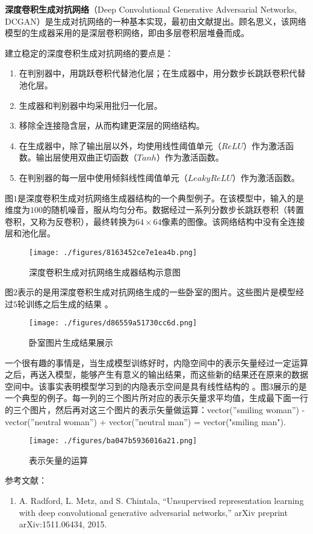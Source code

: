 
\textbf{深度卷积生成对抗网络}（Deep Convolutional Generative Adversarial Networks, DCGAN）是生成对抗网络的一种基本实现，最初由文献\cite{DCGAN}提出。顾名思义，该网络模型的生成器采用的是深层卷积网络，即由多层卷积层堆叠而成。

建立稳定的深度卷积生成对抗网络的要点是\cite{DCGAN}：
\begin{enumerate}
\item 在判别器中，用跳跃卷积代替池化层；在生成器中，用分数步长跳跃卷积代替池化层。
\item 生成器和判别器中均采用批归一化层。
\item 移除全连接隐含层，从而构建更深层的网络结构。
\item 在生成器中，除了输出层以外，均使用线性阈值单元（$ReLU$）作为激活函数。输出层使用双曲正切函数（$Tanh$）作为激活函数。
\item 在判别器的每一层中使用倾斜线性阈值单元（$Leaky ReLU$）作为激活函数。
\end{enumerate}

图$1$是深度卷积生成对抗网络生成器结构的一个典型例子。在该模型中，输入的是维度为$100$的随机噪音，服从均匀分布。数据经过一系列分数步长跳跃卷积（转置卷积，又称为反卷积），最终转换为$64 \times64$像素的图像。该网络结构中没有全连接层和池化层。
\begin{figure}[ht]
\centering
\texttt{[image: ./figures/8163452ce7e1ea4b.png]}
\caption{深度卷积生成对抗网络生成器结构示意图 \cite{DCGAN}} \label{fig_DCGAN_1}
\end{figure}

图$2$表示的是用深度卷积生成对抗网络生成的一些卧室的图片。这些图片是模型经过$5$轮训练之后生成的结果 \cite{DCGAN}。
\begin{figure}[ht]
\centering
\texttt{[image: ./figures/d86559a51730cc6d.png]}
\caption{卧室图片生成结果展示} \label{fig_DCGAN_2}
\end{figure}

一个很有趣的事情是，当生成模型训练好时，内隐空间中的表示矢量经过一定运算之后，再送入模型，能够产生有意义的输出结果，而这些新的结果还在原来的数据空间中。该事实表明模型学习到的内隐表示空间是具有线性结构的 \cite{DCGAN}。图$3$展示的是一个典型的例子。每一列的三个图片所对应的表示矢量求平均值，生成最下面一行的三个图片，然后再对这三个图片的表示矢量做运算：vector(”smiling woman”) - vector(”neutral woman”) + vector(”neutral man”) = vector("smiling man").

\begin{figure}[ht]
\centering
\texttt{[image: ./figures/ba047b5936016a21.png]}
\caption{表示矢量的运算} \label{fig_DCGAN_3}
\end{figure}




参考文献：
\begin{enumerate}
\item A. Radford, L. Metz, and S. Chintala, “Unsupervised representation learning with deep convolutional generative adversarial networks,” arXiv preprint arXiv:1511.06434, 2015.
\end{enumerate}